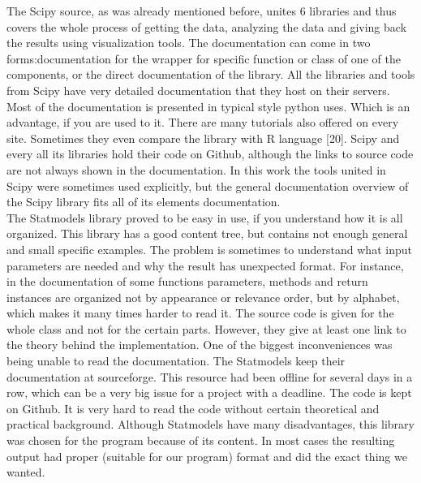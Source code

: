 \documentclass{article}
\begin{document}
The Scipy source, as was already mentioned before, unites 6 libraries and thus covers the whole process of getting the data, analyzing the data and giving back the results using visualization tools. The documentation can come in two forms:documentation for the wrapper for specific function or class of one of the components, or the direct documentation of the library. All the libraries and tools from Scipy have very detailed documentation that they host on their servers. Most of the documentation is presented in typical style python uses. Which is an advantage, if you are used to it. There are many tutorials also offered on every site. Sometimes they even compare the library with R language [20]. Scipy and every all its libraries hold their code on Github, although the links to source code are not always shown in the documentation. In this work the tools united in Scipy were sometimes used explicitly, but the general documentation overview of the Scipy library fits all of its elements documentation.\\
The Statmodels library proved to be easy in use, if you understand how it is all organized. This library has a good content tree, but contains not enough general and small specific examples. The problem is sometimes to understand what input parameters are needed and why the result has unexpected format. For instance, in the documentation of some functions parameters, methods and return instances are organized not by appearance or relevance order, but by alphabet, which makes it many times harder to read it. The source code is given for the whole class and not for the certain parts. However, they give at least one link to the theory behind the implementation. One of the biggest inconveniences was being unable to read the documentation. The Statmodels keep their documentation at sourceforge. This resource had been offline for several days in a row, which can be a very big issue for a project with a deadline. The code is kept on Github. It is very hard to read the code without certain theoretical and practical background. Although Statmodels have many disadvantages, this library was chosen for the program because of its content. In most cases the resulting output had proper (suitable for our program) format and did the exact thing we wanted.\\
\end{document}
